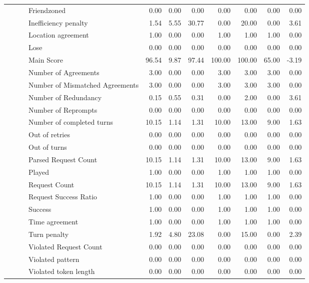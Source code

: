 \begin{tabular}{llllrrrrrrr}
 &  &  & Friendzoned & 0.00 & 0.00 & 0.00 & 0.00 & 0.00 & 0.00 & 0.00 \\
 &  &  & Inefficiency penalty & 1.54 & 5.55 & 30.77 & 0.00 & 20.00 & 0.00 & 3.61 \\
 &  &  & Location agreement & 1.00 & 0.00 & 0.00 & 1.00 & 1.00 & 1.00 & 0.00 \\
 &  &  & Lose & 0.00 & 0.00 & 0.00 & 0.00 & 0.00 & 0.00 & 0.00 \\
 &  &  & Main Score & 96.54 & 9.87 & 97.44 & 100.00 & 100.00 & 65.00 & -3.19 \\
 &  &  & Number of Agreements & 3.00 & 0.00 & 0.00 & 3.00 & 3.00 & 3.00 & 0.00 \\
 &  &  & Number of Mismatched Agreements & 3.00 & 0.00 & 0.00 & 3.00 & 3.00 & 3.00 & 0.00 \\
 &  &  & Number of Redundancy & 0.15 & 0.55 & 0.31 & 0.00 & 2.00 & 0.00 & 3.61 \\
 &  &  & Number of Reprompts & 0.00 & 0.00 & 0.00 & 0.00 & 0.00 & 0.00 & 0.00 \\
 &  &  & Number of completed turns & 10.15 & 1.14 & 1.31 & 10.00 & 13.00 & 9.00 & 1.63 \\
 &  &  & Out of retries & 0.00 & 0.00 & 0.00 & 0.00 & 0.00 & 0.00 & 0.00 \\
 &  &  & Out of turns & 0.00 & 0.00 & 0.00 & 0.00 & 0.00 & 0.00 & 0.00 \\
 &  &  & Parsed Request Count & 10.15 & 1.14 & 1.31 & 10.00 & 13.00 & 9.00 & 1.63 \\
 &  &  & Played & 1.00 & 0.00 & 0.00 & 1.00 & 1.00 & 1.00 & 0.00 \\
 &  &  & Request Count & 10.15 & 1.14 & 1.31 & 10.00 & 13.00 & 9.00 & 1.63 \\
 &  &  & Request Success Ratio & 1.00 & 0.00 & 0.00 & 1.00 & 1.00 & 1.00 & 0.00 \\
 &  &  & Success & 1.00 & 0.00 & 0.00 & 1.00 & 1.00 & 1.00 & 0.00 \\
 &  &  & Time agreement & 1.00 & 0.00 & 0.00 & 1.00 & 1.00 & 1.00 & 0.00 \\
 &  &  & Turn penalty & 1.92 & 4.80 & 23.08 & 0.00 & 15.00 & 0.00 & 2.39 \\
 &  &  & Violated Request Count & 0.00 & 0.00 & 0.00 & 0.00 & 0.00 & 0.00 & 0.00 \\
 &  &  & Violated pattern & 0.00 & 0.00 & 0.00 & 0.00 & 0.00 & 0.00 & 0.00 \\
 &  &  & Violated token length & 0.00 & 0.00 & 0.00 & 0.00 & 0.00 & 0.00 & 0.00 \\

\end{tabular}
